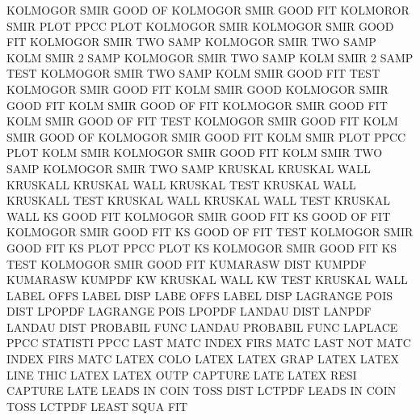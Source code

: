 KOLMOGOR SMIR GOOD OF                   KOLMOGOR SMIR GOOD FIT
KOLMOROR SMIR PLOT                      PPCC     PLOT
KOLMOGOR SMIR                           KOLMOGOR SMIR GOOD FIT
KOLMOGOR SMIR TWO  SAMP                 KOLMOGOR SMIR TWO  SAMP
KOLM     SMIR 2    SAMP                 KOLMOGOR SMIR TWO  SAMP
KOLM     SMIR 2    SAMP TEST            KOLMOGOR SMIR TWO  SAMP
KOLM     SMIR GOOD FIT  TEST            KOLMOGOR SMIR GOOD FIT
KOLM     SMIR GOOD                      KOLMOGOR SMIR GOOD FIT
KOLM     SMIR GOOD OF   FIT             KOLMOGOR SMIR GOOD FIT
KOLM     SMIR GOOD OF   FIT  TEST       KOLMOGOR SMIR GOOD FIT
KOLM     SMIR GOOD OF                   KOLMOGOR SMIR GOOD FIT
KOLM     SMIR PLOT                      PPCC     PLOT
KOLM     SMIR                           KOLMOGOR SMIR GOOD FIT
KOLM     SMIR TWO  SAMP                 KOLMOGOR SMIR TWO  SAMP
KRUSKAL                                 KRUSKAL  WALL
KRUSKALL                                KRUSKAL  WALL
KRUSKAL  TEST                           KRUSKAL  WALL
KRUSKALL TEST                           KRUSKAL  WALL
KRUSKAL  WALL TEST                      KRUSKAL  WALL
KS       GOOD FIT                       KOLMOGOR SMIR GOOD FIT
KS       GOOD OF   FIT                  KOLMOGOR SMIR GOOD FIT
KS       GOOD OF   FIT  TEST            KOLMOGOR SMIR GOOD FIT
KS       PLOT                           PPCC     PLOT
KS                                      KOLMOGOR SMIR GOOD FIT
KS       TEST                           KOLMOGOR SMIR GOOD FIT
KUMARASW DIST                           KUMPDF
KUMARASW                                KUMPDF
KW                                      KRUSKAL  WALL
KW       TEST                           KRUSKAL  WALL
LABEL    OFFS                           LABEL    DISP
LABE     OFFS                           LABEL    DISP
LAGRANGE POIS DIST                      LPOPDF
LAGRANGE POIS                           LPOPDF
LANDAU   DIST                           LANPDF
LANDAU   DIST                           PROBABIL FUNC
LANDAU                                  PROBABIL FUNC
LAPLACE  PPCC                           STATISTI PPCC
LAST     MATC                           INDEX    FIRS MATC
LAST     NOT  MATC                      INDEX    FIRS MATC
LATEX    COLO                           LATEX
LATEX    GRAP                           LATEX
LATEX    LINE THIC                      LATEX
LATEX    OUTP                           CAPTURE  LATE
LATEX    RESI                           CAPTURE  LATE
LEADS    IN   COIN TOSS DIST            LCTPDF
LEADS    IN   COIN TOSS                 LCTPDF
LEAST    SQUA                           FIT
